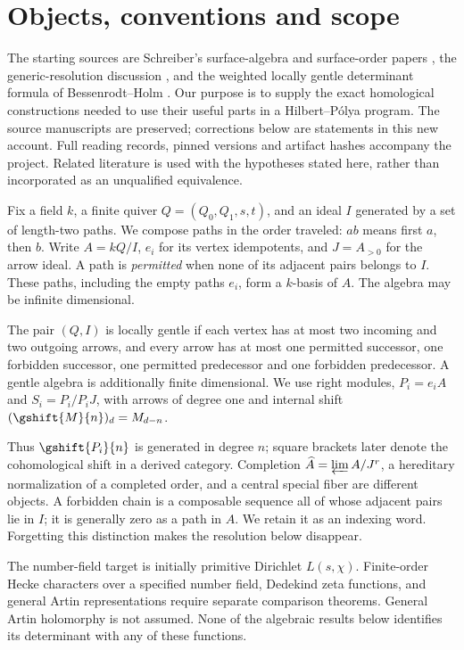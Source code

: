 \section{Objects, conventions and scope}
The starting sources are Schreiber's surface-algebra and surface-order papers \cite{S1,S2}, the generic-resolution discussion \cite{S3}, and the weighted locally gentle determinant formula of Bessenrodt--Holm \cite{BH}. Our purpose is to supply the exact homological constructions needed to use their useful parts in a Hilbert--P\'olya program. The source manuscripts are preserved; corrections below are statements in this new account. Full reading records, pinned versions and artifact hashes accompany the project. Related literature is used with the hypotheses stated here, rather than incorporated as an unqualified equivalence.

Fix a field $k$, a finite quiver $Q=(Q_0,Q_1,s,t)$, and an ideal $I$ generated by a set of length-two paths. We compose paths in the order traveled: $ab$ means first $a$, then $b$. Write $A=kQ/I$, $e_i$ for its vertex idempotents, and $J=A_{>0}$ for the arrow ideal. A path is \emph{permitted} when none of its adjacent pairs belongs to $I$. These paths, including the empty paths $e_i$, form a $k$-basis of $A$. The algebra may be infinite dimensional.

\begin{definition}
The pair $(Q,I)$ is locally gentle if each vertex has at most two incoming and two outgoing arrows, and every arrow has at most one permitted successor, one forbidden successor, one permitted predecessor and one forbidden predecessor. A gentle algebra is additionally finite dimensional. We use right modules, $P_i=e_iA$ and $S_i=P_i/P_iJ$, with arrows of degree one and internal shift $(\gshift{M}{n})_d=M_{d-n}$.
\end{definition}
Thus $\gshift{P_i}{n}$ is generated in degree $n$; square brackets later denote the cohomological shift in a derived category. Completion $\widehat A=\varprojlim A/J^r$, a hereditary normalization of a completed order, and a central special fiber are different objects. A forbidden chain is a composable sequence all of whose adjacent pairs lie in $I$; it is generally zero as a path in $A$. We retain it as an indexing word. Forgetting this distinction makes the resolution below disappear.

The number-field target is initially primitive Dirichlet $L(s,\chi)$. Finite-order Hecke characters over a specified number field, Dedekind zeta functions, and general Artin representations require separate comparison theorems. General Artin holomorphy is not assumed. None of the algebraic results below identifies its determinant with any of these functions.

